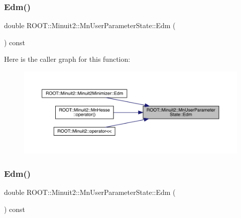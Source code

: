 \mbox{\label{classROOT_1_1Minuit2_1_1MnUserParameterState_a4bf3ac21744e5ffe2d58eec66885f958}} 
\subsubsection{\texorpdfstring{Edm()}{Edm()}\hspace{0.1cm}{\footnotesize\ttfamily [1/3]}}
{\footnotesize\ttfamily double R\+O\+O\+T\+::\+Minuit2\+::\+Mn\+User\+Parameter\+State\+::\+Edm (\begin{DoxyParamCaption}{ }\end{DoxyParamCaption}) const\hspace{0.3cm}{\ttfamily [inline]}}

Here is the caller graph for this function\+:
\nopagebreak
\begin{figure}[H]
\begin{center}
\leavevmode
\includegraphics[width=350pt]{d3/de0/classROOT_1_1Minuit2_1_1MnUserParameterState_a4bf3ac21744e5ffe2d58eec66885f958_icgraph}
\end{center}
\end{figure}
\mbox{\label{classROOT_1_1Minuit2_1_1MnUserParameterState_a4bf3ac21744e5ffe2d58eec66885f958}} 
\subsubsection{\texorpdfstring{Edm()}{Edm()}\hspace{0.1cm}{\footnotesize\ttfamily [2/3]}}
{\footnotesize\ttfamily double R\+O\+O\+T\+::\+Minuit2\+::\+Mn\+User\+Parameter\+State\+::\+Edm (\begin{DoxyParamCaption}{ }\end{DoxyParamCaption}) const\hspace{0.3cm}{\ttfamily [inline]}}

